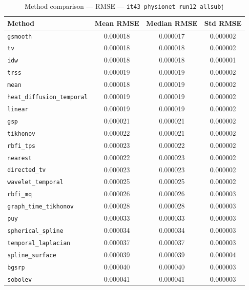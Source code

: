 \begin{table}[ht]
\centering
\caption{Method comparison — RMSE — \texttt{it43_physionet_run12_allsubj}}
\label{tab:rmse_it43_physionet_run12_allsubj}
\begin{tabular}{lccc}
\hline
Method & Mean RMSE & Median RMSE & Std RMSE \\
\hline
\texttt{gsmooth} & 0.000018 & 0.000017 & 0.000002 \\
\texttt{tv} & 0.000018 & 0.000018 & 0.000002 \\
\texttt{idw} & 0.000018 & 0.000018 & 0.000001 \\
\texttt{trss} & 0.000019 & 0.000019 & 0.000002 \\
\texttt{mean} & 0.000018 & 0.000019 & 0.000002 \\
\texttt{heat_diffusion_temporal} & 0.000019 & 0.000019 & 0.000002 \\
\texttt{linear} & 0.000019 & 0.000019 & 0.000002 \\
\texttt{gsp} & 0.000021 & 0.000021 & 0.000002 \\
\texttt{tikhonov} & 0.000022 & 0.000021 & 0.000002 \\
\texttt{rbfi_tps} & 0.000023 & 0.000022 & 0.000002 \\
\texttt{nearest} & 0.000022 & 0.000023 & 0.000002 \\
\texttt{directed_tv} & 0.000023 & 0.000023 & 0.000002 \\
\texttt{wavelet_temporal} & 0.000025 & 0.000025 & 0.000002 \\
\texttt{rbfi_mq} & 0.000026 & 0.000026 & 0.000003 \\
\texttt{graph_time_tikhonov} & 0.000028 & 0.000028 & 0.000003 \\
\texttt{puy} & 0.000033 & 0.000033 & 0.000003 \\
\texttt{spherical_spline} & 0.000034 & 0.000034 & 0.000003 \\
\texttt{temporal_laplacian} & 0.000037 & 0.000037 & 0.000003 \\
\texttt{spline_surface} & 0.000039 & 0.000039 & 0.000004 \\
\texttt{bgsrp} & 0.000040 & 0.000040 & 0.000003 \\
\texttt{sobolev} & 0.000041 & 0.000041 & 0.000003 \\
\hline
\end{tabular}
\end{table}
